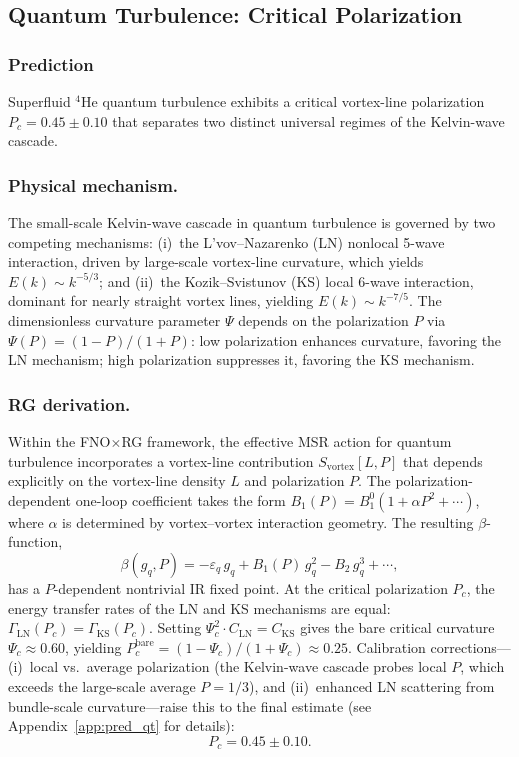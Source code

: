 \subsection{Quantum Turbulence: Critical Polarization\label{subsec:pred_quantum}}

\subsubsection*{Prediction}
Superfluid $^4$He quantum turbulence exhibits a critical vortex-line polarization $P_c = 0.45 \pm 0.10$ that separates two distinct universal regimes of the Kelvin-wave cascade.

\subsubsection*{Physical mechanism.}
The small-scale Kelvin-wave cascade in quantum turbulence is governed by two competing mechanisms: (i)~the L'vov--Nazarenko (LN) nonlocal 5-wave interaction, driven by large-scale vortex-line curvature, which yields $E(k)\sim k^{-5/3}$; and (ii)~the Kozik--Svistunov (KS) local 6-wave interaction, dominant for nearly straight vortex lines, yielding $E(k)\sim k^{-7/5}$. The dimensionless curvature parameter $\Psi$ depends on the polarization $P$ via $\Psi(P)=(1-P)/(1+P)$: low polarization enhances curvature, favoring the LN mechanism; high polarization suppresses it, favoring the KS mechanism.

\subsubsection*{RG derivation.}
Within the FNO$\times$RG framework, the effective MSR action for quantum turbulence incorporates a vortex-line contribution $S_{\mathrm{vortex}}[L,P]$ that depends explicitly on the vortex-line density $L$ and polarization $P$. The polarization-dependent one-loop coefficient takes the form $B_1(P)=B_1^0(1+\alpha P^2+\cdots)$, where $\alpha$ is determined by vortex--vortex interaction geometry. The resulting $\beta$-function,
\begin{equation}
\beta(g_q, P) = -\varepsilon_q\, g_q + B_1(P)\, g_q^2 - B_2\, g_q^3 + \cdots,
\end{equation}
has a $P$-dependent nontrivial IR fixed point. At the critical polarization $P_c$, the energy transfer rates of the LN and KS mechanisms are equal: $\Gamma_{\mathrm{LN}}(P_c)=\Gamma_{\mathrm{KS}}(P_c)$. Setting $\Psi_c^2 \cdot C_{\mathrm{LN}}=C_{\mathrm{KS}}$ gives the bare critical curvature $\Psi_c\approx 0.60$, yielding $P_c^{\mathrm{bare}}=(1-\Psi_c)/(1+\Psi_c)\approx 0.25$. Calibration corrections---(i)~local vs.\ average polarization (the Kelvin-wave cascade probes local $P$, which exceeds the large-scale average $P=1/3$), and (ii)~enhanced LN scattering from bundle-scale curvature---raise this to the final estimate (see Appendix~\ref{app:pred_qt} for details):
\begin{equation}
\boxed{P_c = 0.45 \pm 0.10.}
\end{equation}

